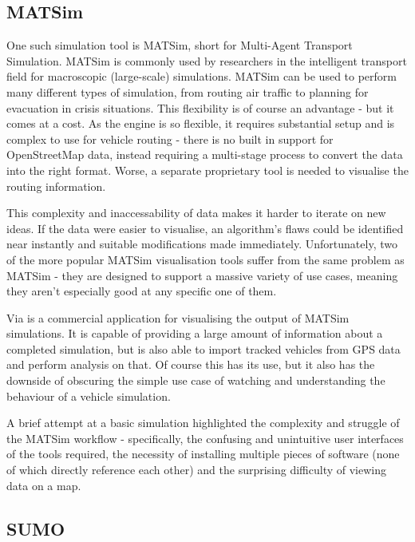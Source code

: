 \documentclass[ %
                    author={Alexander Hill},
                supervisor={Dr. Benjamin Sach},
                    degree={MEng},
                     title={MARMOSET},
                  subtitle={Multi-Agent Route Management using Online Simulation for Efficient Transportation},
                      type={research},
                      year={2016} ]{dissertation}
\begin{document}
\subsection{MATSim}

One such simulation tool is MATSim, short for Multi-Agent Transport Simulation.
MATSim is commonly used by researchers in the intelligent transport field for
macroscopic (large-scale) simulations. MATSim can be used to perform many
different types of simulation, from routing air traffic to planning for
evacuation in crisis situations. This flexibility is of course an advantage -
but it comes at a cost. As the engine is so flexible, it requires substantial
setup and is complex to use for vehicle routing - there is no built in support
for OpenStreetMap data, instead requiring a multi-stage process to convert the
data into the right format. Worse, a separate proprietary tool is needed to
visualise the routing information.

This complexity and inaccessability of data makes it harder to iterate on new
ideas. If the data were easier to visualise, an algorithm's flaws could be
identified near instantly and suitable modifications made immediately.
Unfortunately, two of the more popular MATSim visualisation tools suffer from
the same problem as MATSim - they are designed to support a massive variety of
use cases, meaning they aren't especially good at any specific one of them.

Via is a commercial application for visualising the output of MATSim
simulations. It is capable of providing a large amount of information about a
completed simulation, but is also able to import tracked vehicles from GPS data
and perform analysis on that. Of course this has its use, but it also has the
downside of obscuring the simple use case of watching and understanding the
behaviour of a vehicle simulation.

A brief attempt at a basic simulation highlighted the complexity and struggle of
the MATSim workflow - specifically, the confusing and unintuitive user
interfaces of the tools required, the necessity of installing multiple pieces of
software (none of which directly reference each other) and the surprising
difficulty of viewing data on a map.

\subsection{SUMO}
\end{document}
